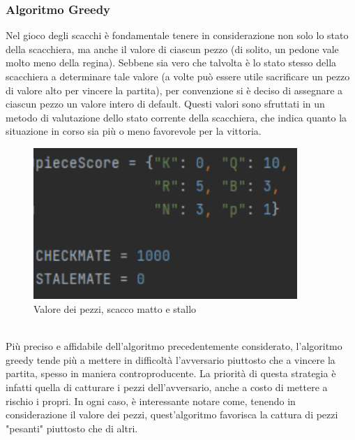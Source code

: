 \subsubsection{Algoritmo Greedy}
Nel gioco degli scacchi è fondamentale tenere in considerazione non solo lo stato della scacchiera, ma anche il valore di ciascun pezzo (di solito, un pedone vale molto meno della regina). Sebbene sia vero che talvolta è lo stato stesso della scacchiera a determinare tale valore (a volte può essere utile sacrificare un pezzo di valore alto per vincere la partita), per convenzione si è deciso di assegnare a ciascun pezzo un valore intero di default. Questi valori sono sfruttati in un metodo di valutazione dello stato corrente della scacchiera, che indica quanto la situazione in corso sia più o meno favorevole per la vittoria.
\begin{figure}[!htb]
    \includegraphics[width=10cm]{frontmatter/figure/valore_pezzi.pdf}
    \centering
    \caption{Valore dei pezzi, scacco matto e stallo}
    \label{fig:valore_pezzi}
\end{figure}\\

Più preciso e affidabile dell'algoritmo precedentemente considerato, l'algoritmo greedy tende più a mettere in difficoltà l'avversario piuttosto che a vincere la partita, spesso in maniera controproducente. La priorità di questa strategia è infatti quella di catturare i pezzi dell'avversario, anche a costo di mettere a rischio i propri. In ogni caso, è interessante notare come, tenendo in considerazione il valore dei pezzi, quest'algoritmo favorisca la cattura di pezzi "pesanti" piuttosto che di altri. 

